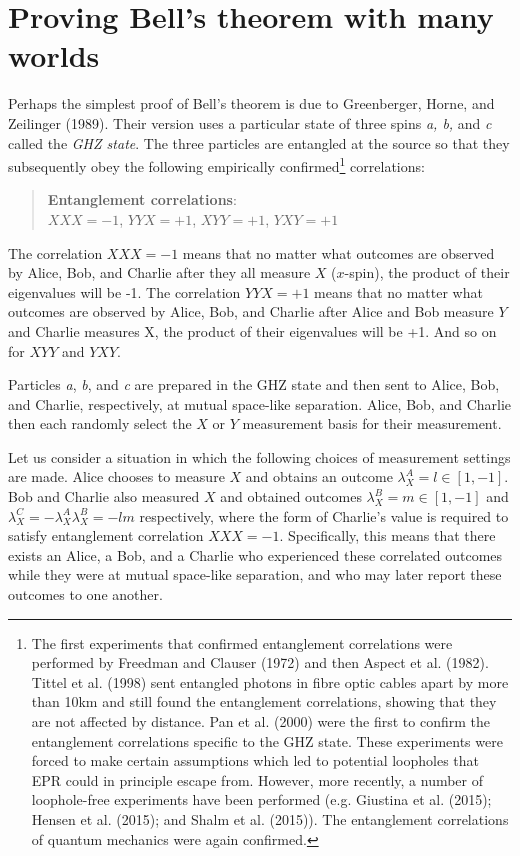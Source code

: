\documentclass[a4paper]{article}
\begin{document}
\section{Proving Bell's theorem with many worlds} \label{BellMany}

Perhaps the simplest proof of Bell's theorem is due to Greenberger, Horne, and Zeilinger (1989). Their version uses a particular state of three spins \textit{a, b,} and \textit{c} called the \textit{GHZ state}. The three particles are entangled at the source so that they subsequently obey the following empirically confirmed\footnote{The first experiments that confirmed entanglement correlations were performed by Freedman and Clauser (1972) and then Aspect et al. (1982). Tittel et al. (1998) sent entangled photons in fibre optic cables apart by more than 10km and still found the entanglement correlations, showing that they are not affected by distance. Pan et al. (2000) were the first to confirm the entanglement correlations specific to the GHZ state. These experiments were forced to make certain assumptions which led to potential loopholes that EPR could in principle escape from. However, more recently, a number of loophole-free experiments have been performed (e.g. Giustina et al. (2015); Hensen et al. (2015); and Shalm et al. (2015)). The entanglement correlations of quantum mechanics were again confirmed.} correlations:

\begin{quote}
\textbf{Entanglement correlations}:\\ $XXX=-1$, $YYX = +1$, $XYY = +1$, $YXY = +1$ 
\end{quote}

The correlation $XXX=-1$ means that no matter what outcomes are observed by Alice, Bob, and Charlie after they all measure $X$ ($x$-spin), the product of their eigenvalues will be -1. The correlation $YYX=+1$ means that no matter what outcomes are observed by Alice, Bob, and Charlie after Alice and Bob measure $Y$ and Charlie measures X, the product of their eigenvalues will be +1. And so on for $XYY$ and $YXY$.

Particles \textit{a}, \textit{b}, and \textit{c} are prepared in the GHZ state and then sent to Alice, Bob, and Charlie, respectively, at mutual space-like separation. Alice, Bob, and Charlie then each randomly select the $X$ or $Y$ measurement basis for their measurement.

Let us consider a situation in which the following choices of measurement settings are made. Alice chooses to measure $X$ and obtains an outcome $\lambda_X^A = l \in [1,-1]$. Bob and Charlie also measured $X$ and obtained outcomes $\lambda_X^B = m \in [1,-1]$ and $\lambda_X^C = -\lambda_X^A \lambda_X^B = -lm$ respectively, where the form of Charlie's value is required to satisfy entanglement correlation $XXX=-1$.  Specifically, this means that there exists an Alice, a Bob, and a Charlie who experienced these correlated outcomes while they were at mutual space-like separation, and who may later report these outcomes to one another.
\end{document}
